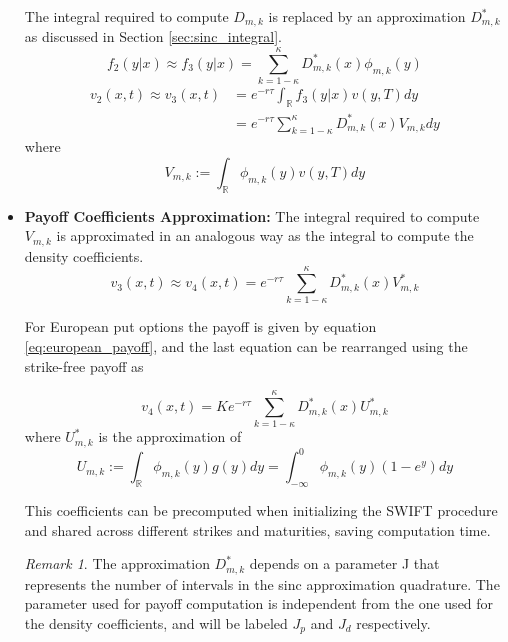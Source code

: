 \documentclass[12,twoside]{mammeTFM}
\theoremstyle{definition}
\theoremstyle{remark}
\newtheorem{remark}[thm]{Remark}
\newcommand{\R}{\ensuremath{\mathbb{R}}}
\begin{document}
\begin{itemize}
The integral required to compute $D_{m,k}$ is replaced by an approximation $D_{m,k}^{*}$ as discussed in Section \ref{sec:sinc_integral}.
\begin{equation}
f_2 (y|x) \approx f_3(y | x) = \sum_{k = 1 - \kappa}^{\kappa} D_{m,k}^{*}(x)\phi_{m,k}(y)
\end{equation}
\begin{equation}
\begin{aligned}
v_2(x,t) \approx v_3(x,t) & = e^{-r \tau} \int_{\R} f_3(y|x)v(y, T)dy \\
&= e^{-r \tau} \sum_{k = 1 - \kappa}^{\kappa} D_{m,k}^{*}(x)  V_{m,k}dy
\end{aligned}
\end{equation}
where
\begin{equation}
V_{m,k} := \int_{\R} \phi_{m,k}(y) v(y, T)dy
\end{equation}
\item \textbf{Payoff Coefficients Approximation: }
The integral required to compute $V_{m,k}$ is approximated in an analogous way as the integral to compute the density coefficients.
\begin{equation}
v_3(x,t) \approx v_4(x,t) = e^{-r \tau} \sum_{k = 1 - \kappa}^{\kappa} D_{m,k}^{*}(x) V_{m,k}^{*}
\end{equation}

For European put options the payoff is given by equation \ref{eq:european_payoff}, and the last equation can be rearranged using the strike-free payoff as

\begin{equation} \label{step:final}
v_4(x,t) = K e^{-r \tau} \sum_{k = 1 - \kappa}^{\kappa} D_{m,k}^{*}(x) U_{m,k}^{*}
\end{equation}
where $U_{m,k}^{*}$ is the approximation of 
\begin{equation} \label{eq:compact_payoffs}
U_{m,k} := \int_{\R} \phi_{m,k}(y)g(y) dy = \int_{-\infty}^{0} \phi_{m,k}(y)(1-e^{y}) dy
\end{equation}

This coefficients can be precomputed when initializing the SWIFT procedure and shared across different strikes and maturities, saving computation time.
\begin{remark}
The approximation $D_{m,k}^{*}$ depends on a parameter J that represents the number of intervals in the sinc approximation quadrature. The parameter used for payoff computation is independent from the one used for the density coefficients, and will be labeled $J_p$ and $J_d$ respectively.
\end{remark}
\end{itemize}
\end{document}
